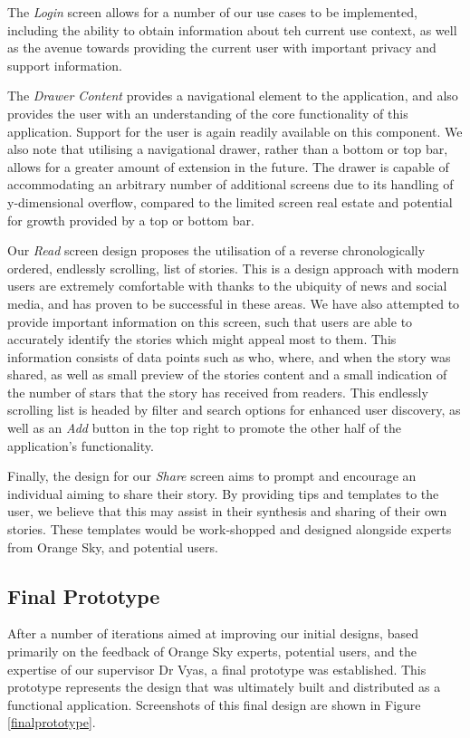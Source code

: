 The \emph{Login} screen allows for a number of our use cases to be implemented, including the ability to obtain information about teh current use context, as well as the avenue towards providing the current user with important privacy and support information.

The \emph{Drawer Content} provides a navigational element to the application, and also provides the user with an understanding of the core functionality of this application. Support for the user is again readily available on this component. We also note that utilising a navigational drawer, rather than a bottom or top bar, allows for a greater amount of extension in the future. The drawer is capable of accommodating an arbitrary number of additional screens due to its handling of y-dimensional overflow, compared to the limited screen real estate and potential for growth provided by a top or bottom bar.

Our \emph{Read} screen design proposes the utilisation of a reverse chronologically ordered, endlessly scrolling, list of stories. This is a design approach with modern users are extremely comfortable with thanks to the ubiquity of news and social media, and has proven to be successful in these areas. We have also attempted to provide important information on this screen, such that users are able to accurately identify the stories which might appeal most to them. This information consists of data points such as who, where, and when the story was shared, as well as small preview of the stories content and a small indication of the number of stars that the story has received from readers. This endlessly scrolling list is headed by filter and search options for enhanced user discovery, as well as an \emph{Add} button in the top right to promote the other half of the application's functionality.

Finally, the design for our \emph{Share} screen aims to prompt and encourage an individual aiming to share their story. By providing tips and templates to the user, we believe that this may assist in their synthesis and sharing of their own stories. These templates would be work-shopped and designed alongside experts from Orange Sky, and potential users.

\subsection{Final Prototype}

After a number of iterations aimed at improving our initial designs, based primarily on the feedback of Orange Sky experts, potential users, and the expertise of our supervisor Dr Vyas, a final prototype was established. This prototype represents the design that was ultimately built and distributed as a functional application. Screenshots of this final design are shown in Figure \ref{finalprototype}.

